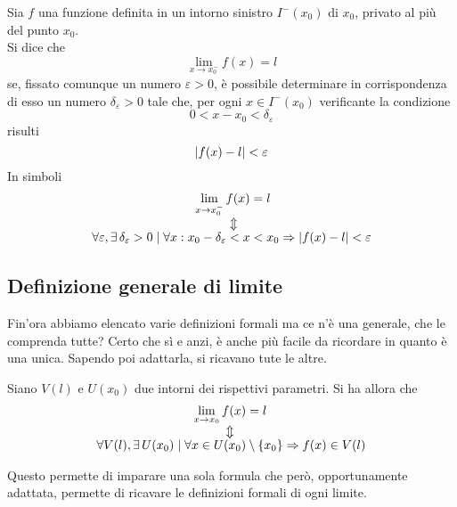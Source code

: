 \begin{definizioneLimiteFinitoSinistro}
	Sia $f$ una funzione definita in un intorno sinistro $I^-(x_0)$ di $x_0$, privato al più del punto
	$x_0$.\\
	Si dice che
	\begin{equation*}
	\lim\limits_{x\to x_0^-}f(x) = l
	\end{equation*}
	se, fissato comunque un numero $\varepsilon>0$, è possibile determinare in corrispondenza di esso
	un numero $\delta_\varepsilon>0$ tale che, per ogni $x\in I^-(x_0)$ verificante la condizione
	\begin{equation*}
	0<x-x_0<\delta_\varepsilon
	\end{equation*}
	risulti
	\begin{equation*}
	\lvert f(x)-l\rvert<\varepsilon
	\end{equation*}
	In simboli
	\begin{align*}
	\lim\limits_{x\to x_0^-} f(x) &= l\\
	\ArrowBetweenLines
	\forall \varepsilon, \exists\,\delta_\varepsilon>0\mid\forall x: x_0-\delta_\varepsilon<x&<x_0
	\Rightarrow \vert f(x) - l\vert < \varepsilon
	\end{align*}
\end{definizioneLimiteFinitoSinistro}

\subsection{Definizione generale di limite}
Fin'ora abbiamo elencato varie definizioni formali ma ce n'è una generale, che le comprenda tutte? 
Certo che sì e anzi, è anche più facile da ricordare in quanto è una unica. Sapendo poi adattarla, si
ricavano tute le altre.
\begin{definizioneGeneraleLimite}
	Siano $V(l)$ e $U(x_0)$ due intorni dei rispettivi parametri. Si ha allora che
	\begin{align*}
	\lim\limits_{x\to x_0} f(x) &= l\\
	\ArrowBetweenLines
	\forall V(l), \exists\,U(x_0)\mid\forall x\in U(x_0)&\setminus\{x_0\}\Rightarrow f(x)\in V(l)
	\end{align*}
\end{definizioneGeneraleLimite}
Questo permette di imparare una sola formula che però, opportunamente adattata, permette di ricavare
le definizioni formali di ogni limite.


